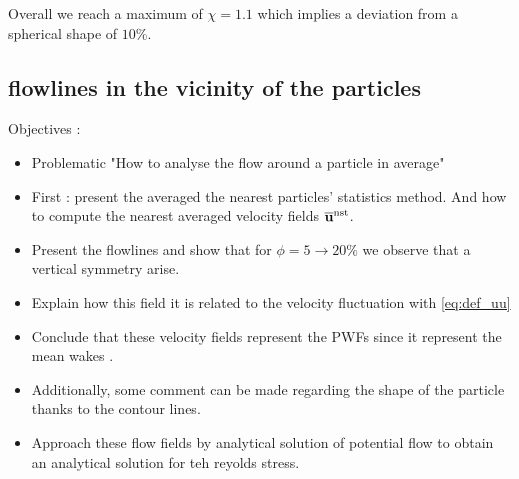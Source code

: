 Overall we reach a maximum of $\chi = 1.1$ which implies a deviation from a spherical shape of $10 \%$. 



\subsection{flowlines in the vicinity of the particles}
Objectives : 
\begin{itemize}
    \item Problematic "How to analyse the flow around a particle in average"
    \item First : present the averaged the nearest particles' statistics method. And how to compute the nearest averaged velocity fields $\overline{\textbf{u}}^\text{nst}$.
    \item Present the flowlines and show that for $\phi = 5 \rightarrow 20\%$ we observe that a vertical symmetry arise.
    \item Explain how this field it is related to the velocity fluctuation with \ref{eq:def_uu}
    \item Conclude that these velocity fields represent the PWFs since it represent the mean wakes \citep{du2022analysis}.  
    \item Additionally, some comment can be made regarding the shape of the particle thanks to the contour lines. 
    \item Approach these flow fields by analytical solution of potential flow to obtain an analytical solution for teh reyolds stress. 
\end{itemize}

